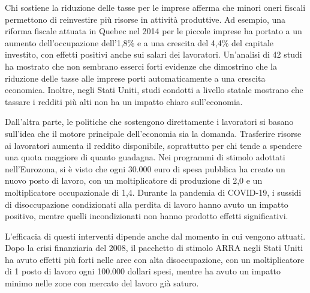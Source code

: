 \documentclass[12pt]{book} %
\begin{document}
Chi sostiene la riduzione delle tasse per le imprese afferma che minori oneri fiscali permettono di reinvestire più risorse in attività produttive. Ad esempio, una riforma fiscale attuata in Quebec nel 2014 per le piccole imprese ha portato a un aumento dell'occupazione dell'1,8\% e a una crescita del 4,4\% del capitale investito, con effetti positivi anche sui salari dei lavoratori. Un'analisi di 42 studi ha mostrato che non sembrano esserci forti evidenze che dimostrino che la riduzione delle tasse alle imprese porti automaticamente a una crescita economica. Inoltre, negli Stati Uniti, studi condotti a livello statale mostrano che tassare i redditi più alti non ha un impatto chiaro sull’economia.

Dall'altra parte, le politiche che sostengono direttamente i lavoratori si basano sull'idea che il motore principale dell'economia sia la domanda. Trasferire risorse ai lavoratori aumenta il reddito disponibile, soprattutto per chi tende a spendere una quota maggiore di quanto guadagna. Nei programmi di stimolo adottati nell'Eurozona, si è visto che ogni 30.000 euro di spesa pubblica ha creato un nuovo posto di lavoro, con un moltiplicatore di produzione di 2,0 e un moltiplicatore occupazionale di 1,4. Durante la pandemia di COVID-19, i sussidi di disoccupazione condizionati alla perdita di lavoro hanno avuto un impatto positivo, mentre quelli incondizionati non hanno prodotto effetti significativi.

L'efficacia di questi interventi dipende anche dal momento in cui vengono attuati. Dopo la crisi finanziaria del 2008, il pacchetto di stimolo ARRA negli Stati Uniti ha avuto effetti più forti nelle aree con alta disoccupazione, con un moltiplicatore di 1 posto di lavoro ogni 100.000 dollari spesi, mentre ha avuto un impatto minimo nelle zone con mercato del lavoro già saturo.
\end{document}
